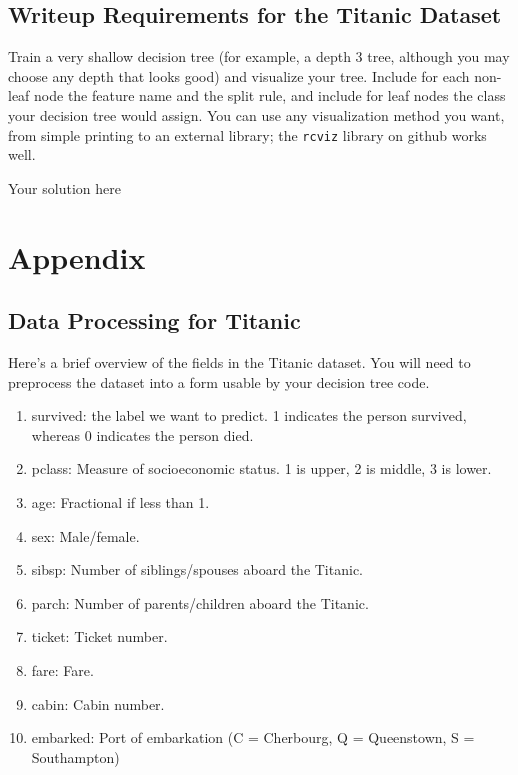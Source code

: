 \subsection{\bf  Writeup Requirements for the Titanic Dataset}

	Train a very shallow decision tree (for example, a depth 3 tree, although you may choose any depth that looks good) and visualize your tree. Include for each non-leaf node the feature name and the split rule, and include for leaf nodes the class your decision tree would assign. You can use any visualization method you want, from simple printing to an external library; the \texttt{rcviz} library on github works well.
	
\begin{solution}
Your solution here
\end{solution}


\newpage

\appendix
\section{Appendix}

\subsection*{Data Processing for Titanic}

Here's a brief overview of the fields in the Titanic dataset. You will need to preprocess the dataset into a form usable by your decision tree code.

\begin{enumerate}
\item survived: the label we want to predict. 1 indicates the person survived, whereas 0 indicates the person died.
\item pclass: Measure of socioeconomic status. 1 is upper, 2 is middle, 3 is lower.
\item age: Fractional if less than 1.
\item sex: Male/female.
\item sibsp: Number of siblings/spouses aboard the Titanic.
\item parch: Number of parents/children aboard the Titanic.
\item ticket: Ticket number.
\item fare: Fare.
\item cabin: Cabin number.
\item embarked: Port of embarkation (C = Cherbourg, Q = Queenstown, S = Southampton)
\end{enumerate}

